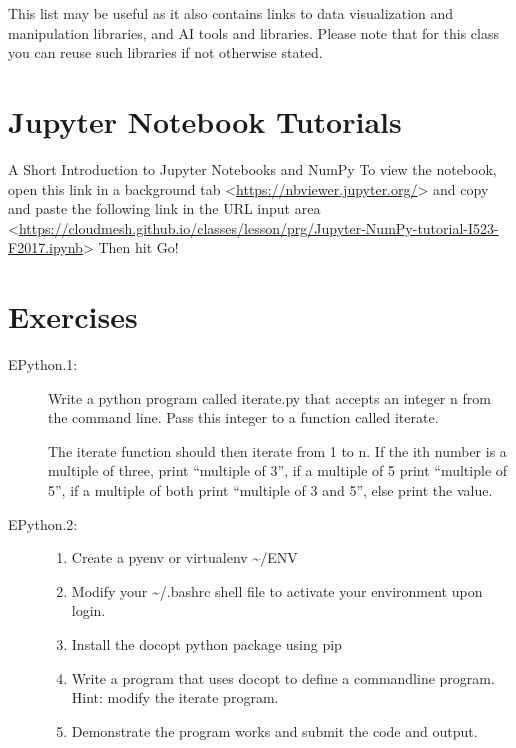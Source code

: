 This list may be useful as it also contains links to data visualization
and manipulation libraries, and AI tools and libraries. Please note that
for this class you can reuse such libraries if not otherwise stated.

\section{Jupyter Notebook Tutorials}\label{jupyter-notebook-tutorials}

A Short Introduction to Jupyter Notebooks and NumPy To view the
notebook, open this link in a background tab
\textless{}\url{https://nbviewer.jupyter.org/}\textgreater{} and copy
and paste the following link in the URL input area
\textless{}\url{https://cloudmesh.github.io/classes/lesson/prg/Jupyter-NumPy-tutorial-I523-F2017.ipynb}\textgreater{}
Then hit Go!

\section{Exercises}\label{exercises}

\begin{description}
\item[EPython.1:]
Write a python program called iterate.py that accepts an integer n from
the command line. Pass this integer to a function called iterate.

The iterate function should then iterate from 1 to n. If the ith number
is a multiple of three, print ``multiple of 3'', if a multiple of 5
print ``multiple of 5'', if a multiple of both print ``multiple of 3 and
5'', else print the value.
\item[EPython.2:]
\begin{enumerate}
\tightlist
\item
  Create a pyenv or virtualenv \textasciitilde{}/ENV
\item
  Modify your \textasciitilde{}/.bashrc shell file to activate your
  environment upon login.
\item
  Install the docopt python package using pip
\item
  Write a program that uses docopt to define a commandline program.
  Hint: modify the iterate program.
\item
  Demonstrate the program works and submit the code and output.
\end{enumerate}
\end{description}
